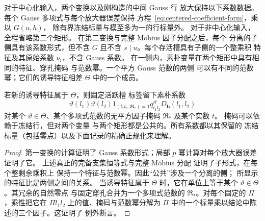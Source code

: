 \begin{lemma}[完备抽取下的公共系数]
\label{lem:centered-coefficient-invariant}
对于中心化输入，两个变换以及刚构造的中间 Gauss 行
放大保持以下系数数据。
每个 Gauss 多项式与每个放大器误差保持
方程~\eqref{eq:centered-coefficient-form}，乘以 \(G(u,h)\)，
除有界冻结标量与模至多为一的行标量外。
对于非中心化输入，全程省略第二个矩形。
在第二变换与完整 M\"obius 因子分配之后，每个
分离的子侧具有该系数形式，但不含 \(G\) 且不含
\(s\mid u\)。每个存活槽具有子侧的一个整乘积
特征及其原始系数 \(\nu_i\)，不含 Gauss 系数。
在一侧内，素朴变量在两个矩形中具有相同的特征、穿孔掩码
与范数幂。一个平方 Gauss 范数的两侧
可以有不同的范数幂；它们的诱导特征相差
\(\Theta\) 中的一个成员。

若新的诱导特征属于 \(\Theta\)，则固定活跃槽
标签留下素朴系数
\[
 \vartheta(l_1)\vartheta(l_2)
 1_{(l_1l_2,\mathfrak R_*)=1}q_{l_1l_2}^{it}D_{\mathbf b}(l_1,l_2)
\]
对某个 \(\vartheta\in\Theta\)、某个多项式范数的无平方因子掩码
\(\mathfrak R_*\) 及某个实数 \(t\)。
掩码可以依赖于冻结行，但对两个变量
与两个矩形都是公共的。所有系数都以其保留的
冻结标量（包括零点）以及下面记录的精确正规化来理解。
\end{lemma}

\begin{proof}
第一变换的计算证明了 Gauss 系数形式；局部
\(p\) 幂计算对每个放大器误差证明了它。
上述真正的完备支集恒等式与完整 M\"obius 分配
证明了子形式，在每个整剩余乘积上
保持一个特征与范数幂。因此“公共”涉及一个分离的侧；
所显示的特征比是两侧之间的关系。
当诱导特征属于 \(\Theta\) 时，它在单位上等于某个
\(\vartheta\in\Theta\)。其冗余的自然零点
与固定穿孔合并为一个多项式范数的
\(\mathfrak R_*\)。对每个固定的 \(\Pi\)，乘性把它在
\(\Pi l_1l_2\) 上的值、掩码与范数幂分解为 \(\Pi\)
中的一个标量乘以结论中陈述的三个因子。这证明了
例外断言。
\end{proof}
